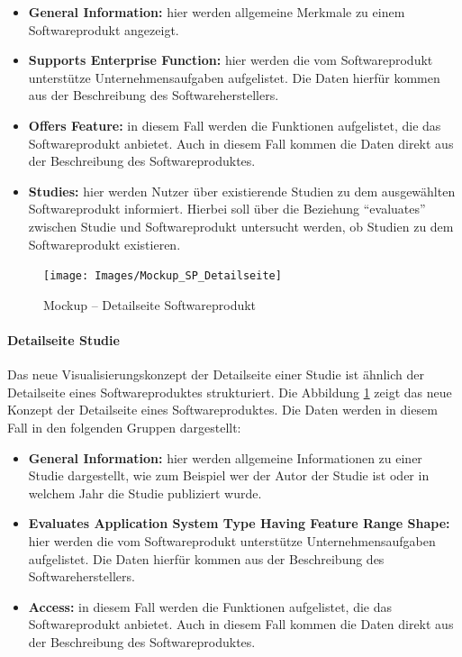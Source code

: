\begin{itemize}
\item \textbf{General Information:} hier werden allgemeine Merkmale zu einem Softwareprodukt angezeigt.
\item \textbf{Supports Enterprise Function:} hier werden die vom Softwareprodukt unterstütze Unternehmensaufgaben aufgelistet. Die Daten hierfür kommen aus der Beschreibung des Softwareherstellers.
\item \textbf{Offers Feature:} in diesem Fall werden die Funktionen aufgelistet, die das Softwareprodukt anbietet. Auch in diesem Fall kommen die Daten direkt aus der Beschreibung des Softwareproduktes.
\item \textbf{Studies:} hier werden Nutzer über existierende Studien zu dem ausgewählten Softwareprodukt informiert. Hierbei soll über die Beziehung \enquote{evaluates} zwischen Studie und Softwareprodukt untersucht werden, ob  Studien zu dem Softwareprodukt existieren.
\end{itemize}

\begin{figure}[H]
	\centering
    	\texttt{[image: Images/Mockup\_SP\_Detailseite]}
   	\caption[Mockup -- Detailseite Softwareprodukt]{Mockup -- Detailseite Softwareprodukt}
   	\label{fig:mockup_sp_detail}
\end{figure}

\paragraph{Detailseite Studie}

Das neue Visualisierungskonzept der Detailseite einer Studie ist ähnlich der Detailseite eines Softwareproduktes strukturiert.
Die Abbildung \ref{fig:mockup_sp_detail} zeigt das neue Konzept der Detailseite eines Softwareproduktes.
Die Daten werden in diesem Fall in den folgenden Gruppen dargestellt:

\begin{itemize}
\item \textbf{General Information:} hier werden allgemeine Informationen zu einer Studie dargestellt, wie zum Beispiel wer der Autor der Studie ist oder in welchem Jahr die Studie publiziert wurde.
\item \textbf{Evaluates Application System Type Having Feature Range Shape:} hier werden die vom Softwareprodukt unterstütze Unternehmensaufgaben aufgelistet. Die Daten hierfür kommen aus der Beschreibung des Softwareherstellers.
\item \textbf{Access:} in diesem Fall werden die Funktionen aufgelistet, die das Softwareprodukt anbietet. Auch in diesem Fall kommen die Daten direkt aus der Beschreibung des Softwareproduktes.
\end{itemize}

